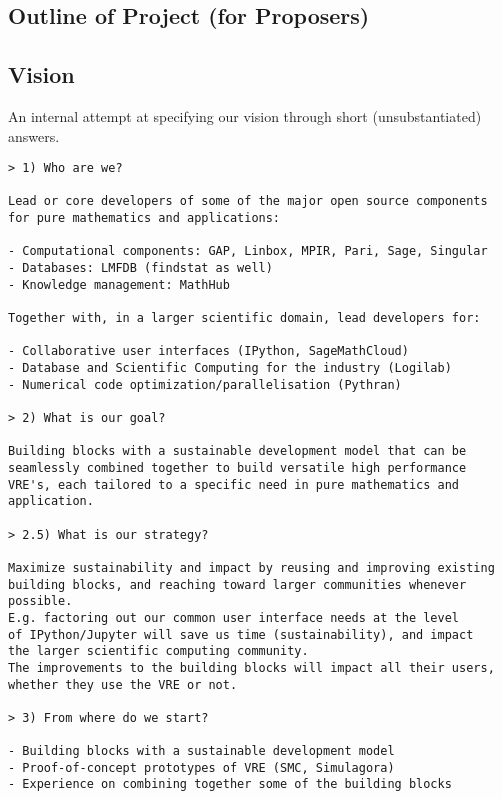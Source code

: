 \begin{draft}
\red

\section*{Outline of Project (for Proposers)}


\subsection*{Vision}

An internal attempt at specifying our vision through short
(unsubstantiated) answers.

\begin{verbatim}
> 1) Who are we?

Lead or core developers of some of the major open source components
for pure mathematics and applications:

- Computational components: GAP, Linbox, MPIR, Pari, Sage, Singular
- Databases: LMFDB (findstat as well)
- Knowledge management: MathHub

Together with, in a larger scientific domain, lead developers for:

- Collaborative user interfaces (IPython, SageMathCloud)
- Database and Scientific Computing for the industry (Logilab)
- Numerical code optimization/parallelisation (Pythran)

> 2) What is our goal?

Building blocks with a sustainable development model that can be
seamlessly combined together to build versatile high performance
VRE's, each tailored to a specific need in pure mathematics and
application.

> 2.5) What is our strategy?

Maximize sustainability and impact by reusing and improving existing
building blocks, and reaching toward larger communities whenever possible.
E.g. factoring out our common user interface needs at the level
of IPython/Jupyter will save us time (sustainability), and impact
the larger scientific computing community.
The improvements to the building blocks will impact all their users,
whether they use the VRE or not.

> 3) From where do we start?

- Building blocks with a sustainable development model
- Proof-of-concept prototypes of VRE (SMC, Simulagora)
- Experience on combining together some of the building blocks


\end{verbatim}
\end{draft}
